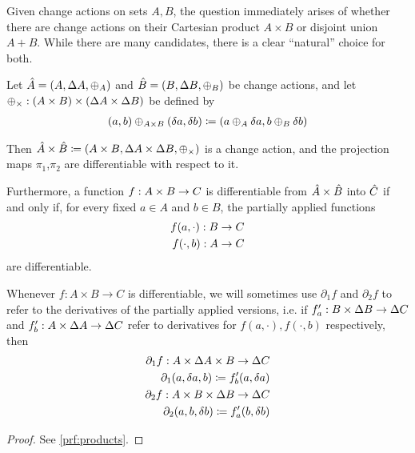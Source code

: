 Given change actions on sets $A, B$, the question immediately arises of whether there are
change actions on their Cartesian product $A \times B$ or disjoint union $A + B$. While there are
many candidates, there is a clear ``natural'' choice for both.

\begin{prop}[name=Products, restate=products]
  \label{prop:products}
  Let $\hat{A} = (A,\Delta A,\oplus_A)$ and $\hat{B} =
  (B,\Delta B,\oplus_B)$ be change actions,
  and let $\oplus_{\times} : (A \times B) \times (\Delta A \times \Delta B)$ be defined by
  \begin{align*}
    (a, b) \oplus_{A \times B} (\delta a, \delta b) \coloneqq (a \oplus_A \delta a, b \oplus_B \delta b)
  \end{align*}

  Then $\hat{A} \times \hat{B} \coloneqq (A \times B,\Delta A \times
  \Delta B,\oplus_{\times})$ is a change action, and the projection maps $\pi_1$,$\pi_2$
  are differentiable with respect to it.

  Furthermore, a function 
  $f : A \times B \rightarrow C$ is differentiable from $\hat{A} \times \hat{B}$ into $\hat{C}$ if
  and only if, for every fixed $a \in A$ and $b \in B$, the partially applied functions 
  \begin{align*}
    f(a, \cdot) : B \rightarrow C\\
    f(\cdot, b) : A \rightarrow C
  \end{align*}
  are differentiable.
\end{prop}

Whenever $f : A \times B \rightarrow C$ is differentiable, we will sometimes use $\partial_1 f$ and
$\partial_2 f$ to refer to the derivatives of the partially applied versions, i.e. if
$f'_a : B \times \Delta B \rightarrow \Delta C$ and
$f'_b : A \times \Delta A \rightarrow \Delta C$ refer to derivatives for 
$f(a, \cdot), f(\cdot, b)$ respectively, then
\begin{align*}
  \partial_1 f : A \times \Delta A \times B \rightarrow \Delta C\\
  \partial_1(a, \delta a, b) \coloneqq f'_b(a, \delta a)\\
  \partial_2 f : A \times B \times \Delta B \rightarrow \Delta C\\
  \partial_2(a, b, \delta b) \coloneqq f'_a(b, \delta b)
\end{align*}

\ifproofs
\begin{proof}
  See \cref{prf:products}.
\end{proof}
\fi


